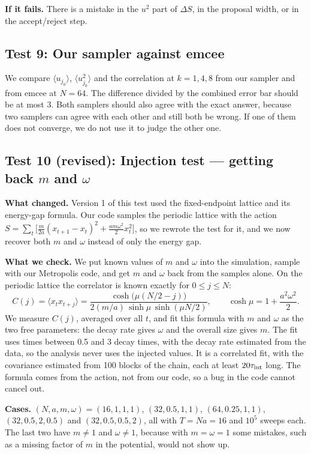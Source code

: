 \documentclass[11pt]{article}
\begin{document}
\textbf{If it fails.} There is a mistake in the $u^2$ part of $\Delta S$, in
the proposal width, or in the accept/reject step.

\subsection*{Test 9: Our sampler against emcee}
We compare $\langle u_{j_0}\rangle$, $\langle u_{j_0}^2\rangle$ and the correlation at $k = 1, 4, 8$ from our sampler and from emcee at $N = 64$. The difference divided by the combined error bar should be at most 3. Both samplers should also agree with the exact answer, because two samplers can agree with each other and still both be wrong. If one of them does not converge, we do not use it to judge the other one.

\subsection*{Test 10 (revised): Injection test --- getting back $m$ and $\omega$}

\textbf{What changed.} Version 1 of this test used the fixed-endpoint lattice
and its energy-gap formula. Our code samples the periodic lattice with the
action $S=\sum_t\big[\tfrac{m}{2a}(x_{t+1}-x_t)^2+\tfrac{a m\omega^2}{2}x_t^2\big]$,
so we rewrote the test for it, and we now recover both $m$ and $\omega$ instead
of only the energy gap.

\textbf{What we check.} We put known values of $m$ and $\omega$ into the
simulation, sample with our Metropolis code, and get $m$ and $\omega$ back from
the samples alone. On the periodic lattice the correlator is known exactly for
$0\le j\le N$:
\begin{equation}
C(j)=\langle x_t x_{t+j}\rangle
=\frac{\cosh\big(\mu(N/2-j)\big)}{2(m/a)\,\sinh\mu\,\sinh(\mu N/2)},
\qquad \cosh\mu=1+\frac{a^2\omega^2}{2}.
\end{equation}
We measure $C(j)$, averaged over all $t$, and fit this formula with $m$ and
$\omega$ as the two free parameters: the decay rate gives $\omega$ and the
overall size gives $m$. The fit uses times between 0.5 and 3 decay times, with
the decay rate estimated from the data, so the analysis never uses the injected
values. It is a correlated fit, with the covariance estimated from 100 blocks of
the chain, each at least $20\tau_{\rm int}$ long. The formula comes from the
action, not from our code, so a bug in the code cannot cancel out.

\textbf{Cases.} $(N,a,m,\omega)=(16,1,1,1)$, $(32,0.5,1,1)$, $(64,0.25,1,1)$,
$(32,0.5,2,0.5)$ and $(32,0.5,0.5,2)$, all with $T=Na=16$ and $10^5$ sweeps
each. The last two have $m\ne1$ and $\omega\ne1$, because with $m=\omega=1$ some
mistakes, such as a missing factor of $m$ in the potential, would not show up.
\end{document}
